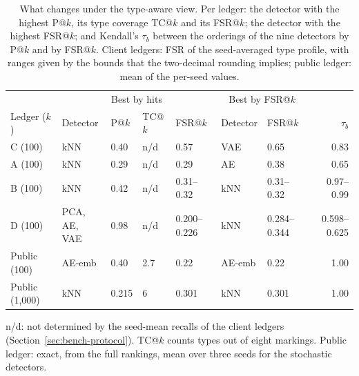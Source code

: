\begin{table}[tbp]
\caption{What changes under the type-aware view. Per ledger: the detector with the highest P@$k$, its type coverage TC@$k$ and its FSR@$k$; the detector with the highest FSR@$k$; and Kendall's $\tau_b$ between the orderings of the nine detectors by P@$k$ and by FSR@$k$. Client ledgers: FSR of the seed-averaged type profile, with ranges given by the bounds that the two-decimal rounding implies; public ledger: mean of the per-seed values.}
\label{tab:typeaware}
\centering
\footnotesize
\setlength{\tabcolsep}{3pt}
\begin{tabular}{@{}lllllllr@{}}
\toprule
 & \multicolumn{4}{c}{Best by hits} & \multicolumn{2}{c}{Best by FSR@$k$} & \\
\cmidrule(lr){2-5}\cmidrule(lr){6-7}
Ledger ($k$) & Detector & P@$k$ & TC@$k$ & FSR@$k$ & Detector & FSR@$k$ & $\tau_b$ \\
\midrule
C (100) & kNN & 0.40 & n/d & 0.57 & VAE & 0.65 & 0.83 \\
A (100) & kNN & 0.29 & n/d & 0.29 & AE & 0.38 & 0.65 \\
B (100) & kNN & 0.42 & n/d & 0.31--0.32 & kNN & 0.31--0.32 & 0.97--0.99 \\
D (100) & \makecell[l]{PCA, AE,\\VAE} & 0.98 & n/d & 0.200--0.226 & kNN & 0.284--0.344 & 0.598--0.625 \\
Public (100) & AE-emb & 0.40 & 2.7 & 0.22 & AE-emb & 0.22 & 1.00 \\
Public (1,000) & kNN & 0.215 & 6 & 0.301 & kNN & 0.301 & 1.00 \\
\bottomrule
\end{tabular}
\par\smallskip\parbox{\linewidth}{\scriptsize n/d: not determined by the seed-mean recalls of the client ledgers (Section~\ref{sec:bench-protocol}). TC@$k$ counts types out of eight markings. Public ledger: exact, from the full rankings, mean over three seeds for the stochastic detectors.}
\end{table}
